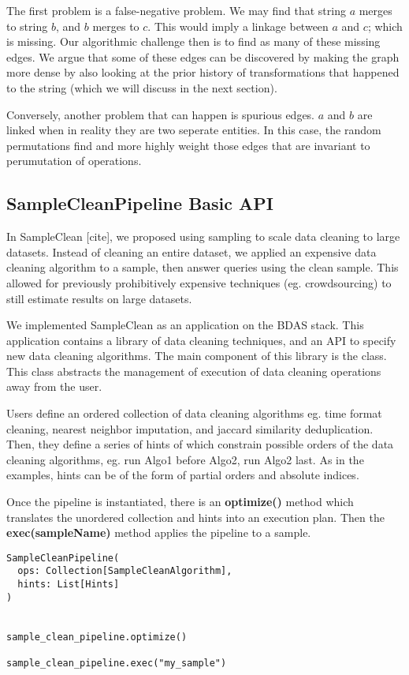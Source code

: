 The first problem is a false-negative problem.
We may find that string $a$ merges to string $b$, and $b$ merges to $c$. 
This would imply a linkage between $a$ and $c$; which is missing.
Our algorithmic challenge then is to find as many of these missing edges.
We argue that some of these edges can be discovered by making the graph more dense 
by also looking at the prior history of transformations that happened to the string (which we will discuss in the next section).

Conversely, another problem that can happen is spurious edges.
$a$ and $b$ are linked when in reality they are two seperate entities.
In this case, the random permutations find and more highly weight those edges that are invariant to perumutation of operations.

\subsection{SampleCleanPipeline Basic API}
In SampleClean [cite], we proposed using sampling to scale data cleaning to large datasets.
Instead of cleaning an entire dataset, we applied an expensive data cleaning algorithm to a sample, then 
answer queries using the clean sample.
This allowed for previously prohibitively expensive techniques (eg. crowdsourcing) to still estimate results
on large datasets.

We implemented SampleClean as an application on the BDAS stack.
This application contains a library of data cleaning techniques, and an API to specify new data cleaning algorithms.
The main component of this library is the \scp class.
This class abstracts the management of execution of data cleaning operations away from the user.

Users define an ordered collection of data cleaning algorithms eg. time format cleaning, nearest neighbor imputation, and jaccard similarity deduplication.
Then, they define a series of hints of which constrain possible orders
of the data cleaning algorithms, eg. run Algo1 before Algo2, run Algo2 last.
As in the examples, hints can be of the form of partial orders and absolute indices.

Once the pipeline is instantiated, there is an \textbf{optimize()} method which
translates the unordered collection and hints into an execution plan.
Then the \textbf{exec(sampleName)} method applies the pipeline to a sample.

\begin{lstlisting}
SampleCleanPipeline( 
  ops: Collection[SampleCleanAlgorithm],
  hints: List[Hints] 
) 


sample_clean_pipeline.optimize()

sample_clean_pipeline.exec("my_sample")
\end{lstlisting}

